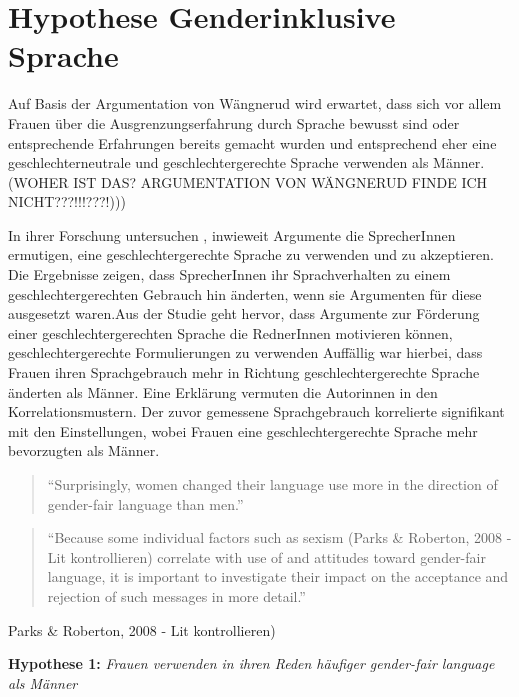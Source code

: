 \documentclass[12pt, 
    twoside=false, 
    bibliography=totoc, 
    numbers=endperiod, 
    headings=normal, 
    toc=chapterentrydotfill
    ]{scrbook}
\begin{document}
\section{Hypothese Genderinklusive Sprache}

Auf Basis der Argumentation von Wängnerud \parencites*{wangnerud_2000}{wangnerud_2009} wird erwartet, dass sich vor allem Frauen über die Ausgrenzungserfahrung durch Sprache bewusst sind oder entsprechende Erfahrungen bereits gemacht wurden und entsprechend eher eine geschlechterneutrale und geschlechtergerechte Sprache verwenden als Männer.  (WOHER IST DAS? ARGUMENTATION VON WÄNGNERUD FINDE ICH NICHT???!!!???!))) 

In ihrer Forschung untersuchen \textcite{koeser_2014}, inwieweit Argumente die SprecherInnen ermutigen, eine geschlechtergerechte Sprache zu verwenden und zu akzeptieren. Die Ergebnisse zeigen, dass SprecherInnen ihr Sprachverhalten zu einem geschlechtergerechten Gebrauch hin änderten, wenn sie Argumenten für diese ausgesetzt waren.Aus der Studie geht hervor, dass Argumente zur Förderung einer geschlechtergerechten Sprache die RednerInnen motivieren können, geschlechtergerechte Formulierungen zu verwenden \parencite[548]{koeser_2014} Auffällig war hierbei, dass Frauen ihren Sprachgebrauch mehr in Richtung geschlechtergerechte Sprache änderten als Männer. Eine Erklärung vermuten die Autorinnen in den Korrelationsmustern. Der zuvor gemessene Sprachgebrauch korrelierte signifikant mit den Einstellungen, wobei Frauen eine geschlechtergerechte Sprache mehr bevorzugten als Männer\parencite[555]{koeser_2014}.

\begin{quote}
    \enquote {Surprisingly, women changed their
language use more in the direction of gender-fair language than men.} \parencite[555]{koeser_2014}
\end{quote}

\begin{quote}
 \enquote {Because some individual factors such as sexism (Parks \& Roberton, 2008 - Lit kontrollieren) correlate with use of and attitudes toward gender-fair language, it is important to investigate their impact on the acceptance and rejection of such messages in more detail.} \parencite[556]{koeser_2014}
\end{quote} Parks \& Roberton, 2008 - Lit kontrollieren) 


\textbf{Hypothese 1:} \emph{Frauen verwenden in ihren Reden häufiger gender-fair language als Männer}
\end{document}
